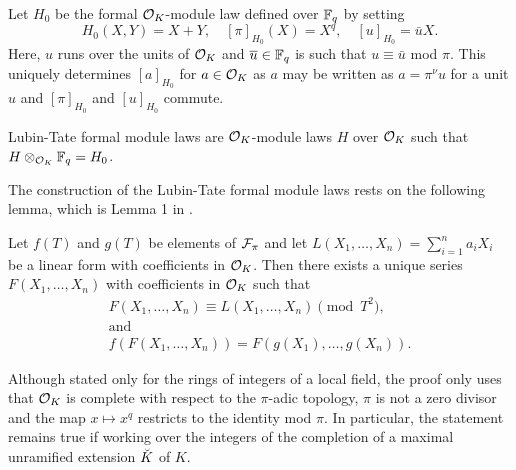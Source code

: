\documentclass[../main.tex]{subfiles}
\begin{document}
Let $H_0$ be the formal $\mathcal{O}_K$-module law defined over $\mathbb{F}_q$ by setting
\begin{equation*}
  H_0(X,Y) = X + Y, \quad [\pi]_{H_0}(X) = X^q, \quad [u]_{H_0}= \bar u X.
\end{equation*}
Here, $u$ runs over the units of $\mathcal{O}_K$ and $\overline u \in \mathbb{F}_q$ is such that 
$u \equiv \bar u$ mod $\pi$. This uniquely determines $[a]_{H_0}$ 
for $a \in \mathcal{O}_K$ as $a$ may be written as $a = \pi^{\nu} u$ for a unit $u$ and
$[\pi]_{H_0}$ and $[u]_{H_0}$ commute. 

Lubin-Tate formal module laws are $\mathcal{O}_K$-module laws $H$ over $\mathcal{O}_K$ such that 
$H \otimes_{\mathcal{O}_K} \mathbb{F}_q = H_0$. 

The construction of the Lubin-Tate formal module laws rests on the following 
lemma, which is Lemma 1 in \cite{LubinTateFormalMult}.
\begin{lem}\label{lem:LTLemma1}
  Let $f(T)$ and $g(T)$ be elements of $\mathcal{F}_\pi$ and let 
  $L(X_1, \dots, X_n) = \sum_{i=1}^n a_i X_i$ be a linear form with coefficients in 
  $\mathcal{O}_K$. Then there exists a unique series $F(X_1, \dots, X_n)$ with coefficients 
  in $\mathcal{O}_K$ such that 
  \begin{gather*}
    F(X_1, \dots, X_n) \equiv L(X_1, \dots, X_n) \pmod {T^2}, \\ \text{and} \\
    f(F(X_1, \dots, X_n)) = F(g(X_1), \dots, g(X_n)).
  \end{gather*}
\end{lem}
Although stated only for the rings of integers of a local field, the proof only
uses that $\mathcal{O}_K$ is complete with respect to the $\pi$-adic topology, $\pi$ is
not a zero divisor and the map $x \mapsto x^q$ restricts to the identity mod $\pi$.
In particular, the statement remains true if working over the integers of the
completion of a maximal unramified extension ${\breve {K}}$ of $K$.
\end{document}
